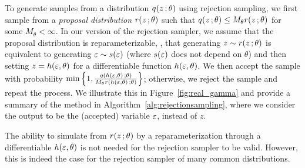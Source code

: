 To generate samples from a distribution $q(z\, ;\theta)$ using rejection sampling, we first sample from a \emph{proposal distribution} $r(z\, ; \theta)$ such that $q(z\, ; \theta) \leq M_\theta r(z\, ; \theta)$ for some $M_\theta <\infty$. In our version of the rejection sampler, we assume that the proposal distribution is reparameterizable, \ie, that generating $z\sim r(z\, ; \theta)$ is equivalent to generating $\varepsilon \sim s(\varepsilon)$ (where $s(\varepsilon)$ does not depend on $\theta$) and then setting $z=h(\varepsilon,\theta)$ for a differentiable function $h(\varepsilon,\theta)$. We then accept the sample with probability $\min\left\{1, \frac{q\left(h(\varepsilon,\theta)\, ; \theta\right)}{M_\theta r\left(h(\varepsilon,\theta) \, ; \theta\right)}\right\}$; otherwise, we reject the sample and repeat the process. We illustrate this in Figure~\ref{fig:real_gamma} and provide a summary of the method in Algorithm~\ref{alg:rejectionsampling}, where we consider the output to be the (accepted) variable $\varepsilon$, instead of $z$.




The ability to simulate from $r(z\, ; \theta)$ by a reparameterization through a differentiable $h(\varepsilon,\theta)$ is not needed for the rejection sampler to be valid. However, this is indeed the case for the rejection sampler of many common distributions.

